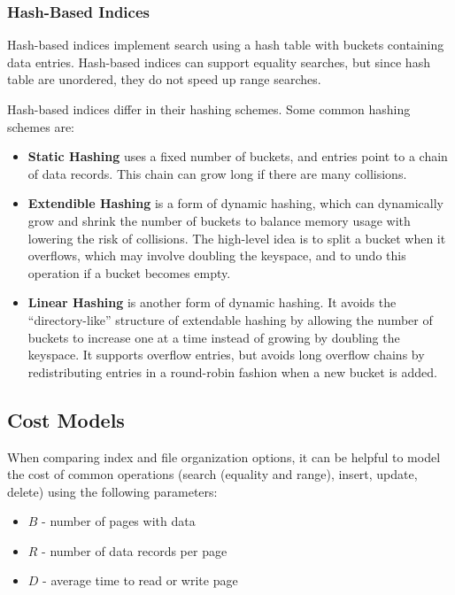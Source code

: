 \documentclass[12pt,titlepage]{article}
\begin{document}
      \subsubsection{Hash-Based Indices}
        Hash-based indices implement search using a hash table with buckets containing data entries. Hash-based indices can support equality
        searches, but since hash table are unordered, they do not speed up range searches.

        Hash-based indices differ in their hashing schemes. Some common hashing schemes are:
        \begin{itemize}
          \item \textbf{Static Hashing} uses a fixed number of buckets, and entries point to a chain of data records. This chain can grow
            long if there are many collisions.
          \item \textbf{Extendible Hashing} is a form of dynamic hashing, which can dynamically grow and shrink the number of buckets to balance
            memory usage with lowering the risk of collisions. The high-level idea is to split a bucket when it overflows, which may involve
            doubling the keyspace, and to undo this operation if a bucket becomes empty.
          \item \textbf{Linear Hashing} is another form of dynamic hashing. It avoids the ``directory-like'' structure of extendable hashing by
            allowing the number of buckets to increase one at a time instead of growing by doubling the keyspace. It supports overflow entries,
            but avoids long overflow chains by redistributing entries in a round-robin fashion when a new bucket is added.
        \end{itemize}

    \subsection{Cost Models}
      When comparing index and file organization options, it can be helpful to model the cost of common operations (search (equality and range),
      insert, update, delete) using the following parameters:
      \begin{itemize}
        \item $B$ - number of pages with data
        \item $R$ - number of data records per page
        \item $D$ - average time to read or write page
      \end{itemize}
\end{document}
